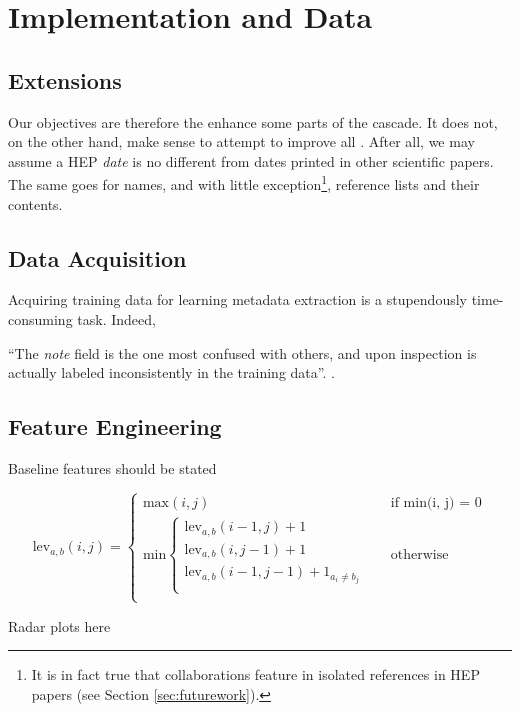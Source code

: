
\chapter{Implementation and Data} %

\label{Chapter4} %



\section{Extensions}

Our objectives are therefore the enhance some parts of the cascade. It does not, on the other hand, make sense to attempt to improve all . After all, we may assume a HEP \emph{date} is no different from dates printed in other scientific papers. The same goes for names, and with little exception\footnote{It is in fact true that collaborations feature in isolated references in HEP papers (see Section \ref{sec:futurework}).}, reference lists and their contents.

\section{Data Acquisition}

Acquiring training data for learning metadata extraction is a stupendously time-consuming task. Indeed, 

``The \emph{note} field is the one most confused with others, and upon inspection is actually labeled inconsistently in the training data''. \cite{Peng04accurateinformation}.

\section{Feature Engineering}

Baseline features should be stated 

\[
  \text{lev}_{a, b}(i, j) = 
  \begin{cases} 
  	\text{max}(i, j) &\quad\text{if min(i, j) = 0} \\
	\text{min}
		\begin{cases}
			\text{lev}_{a, b}(i - 1, j) + 1 \\
			\text{lev}_{a, b}(i, j - 1) + 1 \\
			\text{lev}_{a, b}(i - 1, j - 1) + 1_{a_i \neq b_j} \\
		\end{cases} &\quad\text{otherwise} \\
  \end{cases}
\]

Radar plots here